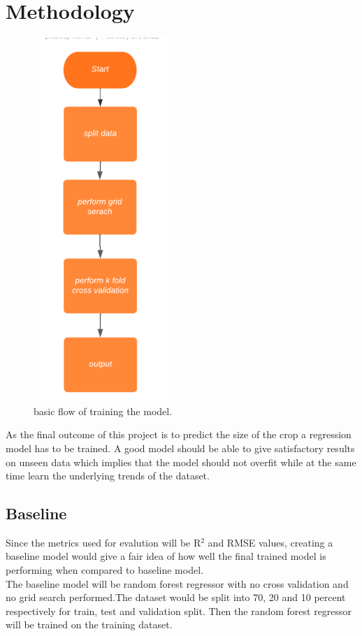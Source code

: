 \documentclass{article}
\begin{document}
\section{Methodology}
\begin{figure}[tb]
\centering
\includegraphics[scale=0.5]{flowchart.png}
\caption{\label{fig:flowchart}basic flow of training the model.}
\end{figure}
As the final outcome of this project is to predict the size of the crop a regression model has to be trained. A good model should be able to give satisfactory results on unseen data which implies that the model should not overfit while at the same time learn the underlying trends of the dataset.

\subsection{Baseline}
Since the metrics used for evalution will be R$^2$ and RMSE values, creating a baseline model would give a fair idea of how well the final trained model is performing when compared to baseline model.\\
The baseline model will be random forest regressor with no cross validation and no grid search performed.The dataset would be split into 70, 20 and 10 percent respectively for train, test and validation split. Then the random forest regressor will be trained on the training dataset.
\end{document}
